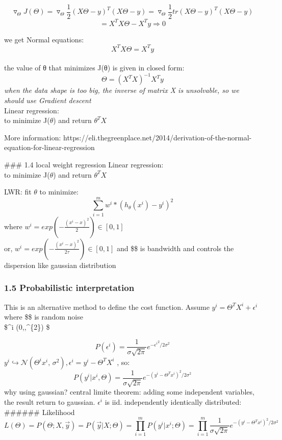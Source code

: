 \documentclass[11pt]{article}
\begin{document}
\[\triangledown_{\Theta} J(\Theta) = \triangledown_{\Theta} \frac{1}{2} (X\Theta - y)^T(X\Theta - y)  
  =\triangledown_{\Theta} \frac{1}{2} tr (X\Theta - y)^T(X\Theta - y) \]
\[= X^TX\Theta - X^Ty \Rightarrow 0\]

we get Normal equations: \[X^TX\Theta = X^Ty \]\\
the value of θ that minimizes J(θ) is given in closed form:
\[\Theta =(X^TX)^{-1}X^Ty\] \emph{when the data shape is too big, the
inverse of matrix X is unsolvable, so we should use Gradient descent}\\
Linear regression:\\
to minimize J(\(\theta\)) and return \(\theta^TX\)

More information:
https://eli.thegreenplace.net/2014/derivation-of-the-normal-equation-for-linear-regression

\#\#\# 1.4 local weight regression Linear regression:\\
to minimize J(\(\theta\)) and return \(\theta^TX\)

LWR: fit \(\theta\) to minimize:\\
\[\sum_{i=1}^m w^i * (h_\theta(x^i) - y^i)^2\] where
\(w^i = exp(-\frac{(x^i-x)^2}{2}) \in [0,1]\)\\
or, \(w^i = exp(-\frac{(x^i-x)^2}{2\tau}) \in [0,1]\) and \$\tau \$ is
bandwidth and controls the dispersion like gaussian distribution

    \subsubsection{1.5 Probabilistic
interpretation}\label{probabilistic-interpretation}

This is an alternative method to define the cost function. Assume
\(y^i = \Theta^TX^i + \epsilon^i\) where \$\epsilon \$ is random noise\\
\$\epsilon\^{}i \hookrightarrow  {}(0,,\sigma\^{}\{2\}) \$

\[ P(\epsilon^i) = \frac{1}{{\sigma \sqrt {2\pi}}} e^{- {\epsilon^i}^2/{2\sigma ^2 }}\]
\(y^i \hookrightarrow \mathcal{N}(\Theta^ix^i,\,\sigma^{2}), \epsilon^i = y^i - \Theta^TX^i\)
, so:
\[ P(y^i|x^i,\Theta) = \frac{1}{{\sigma \sqrt {2\pi}}} e^{- ({y^i -\Theta^Tx^i})^2/{2\sigma ^2 }}\]
why using gaussian? central limite theorem: adding some independent
variables, the result return to gaussian. \(\epsilon^i\) is iid.
independently identically distributed: \#\#\#\#\#\# Likelihood
\[L(\Theta) =  P(\Theta;X, \vec{y})=P(\vec{y}|X; \Theta) = \prod_{i=1}^{m}P(y^i|x^i;\Theta) = \prod_{i=1}^{m} \frac{1}{{\sigma \sqrt {2\pi}}} e^{- ({y^i -\Theta^Tx^i})^2/{2\sigma ^2 }}\]
\end{document}
